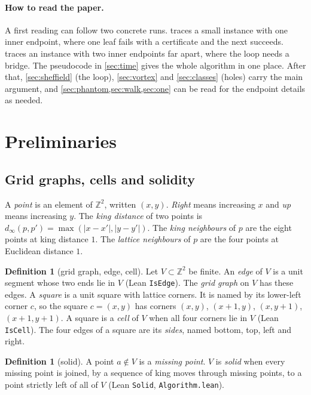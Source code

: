 \documentclass[11pt]{article}
\theoremstyle{plain}
\theoremstyle{definition}
\newtheorem{definition}[theorem]{Definition}
\theoremstyle{remark}
\newcommand{\Z}{\mathbb{Z}}
\newcommand{\lean}[1]{\texttt{#1}}
\newcommand{\dist}{d_\infty}
\begin{document}
\paragraph{How to read the paper.}
A first reading can follow two concrete runs.
 traces a small instance with one inner endpoint, where one leaf fails with a
certificate and the next succeeds.
 traces an instance with two inner endpoints far apart, where the loop needs a
bridge.
The pseudocode in \cref{sec:time} gives the whole algorithm in one place.
After that, \cref{sec:sheffield} (the loop), \cref{sec:vortex} and \cref{sec:classes} (holes) carry
the main argument, and \cref{sec:phantom,sec:walk,sec:one} can be read for the endpoint details as
needed.

\section{Preliminaries}
\label{sec:prelim}

\subsection{Grid graphs, cells and solidity}

A \emph{point} is an element of $\Z^2$, written $(x,y)$.
\emph{Right} means increasing $x$ and \emph{up} means increasing $y$.
The \emph{king distance} of two points is $\dist(p,p')=\max(|x-x'|,|y-y'|)$.
The \emph{king neighbours} of $p$ are the eight points at king distance $1$.
The \emph{lattice neighbours} of $p$ are the four points at Euclidean distance $1$.

\begin{definition}[grid graph, edge, cell]
\label{def:grid}
Let $V\subset\Z^2$ be finite.
An \emph{edge} of $V$ is a unit segment whose two ends lie in $V$ (Lean \lean{IsEdge}).
The \emph{grid graph} on $V$ has these edges.
A \emph{square} is a unit square with lattice corners.
It is named by its lower-left corner $c$, so the square $c=(x,y)$ has corners $(x,y)$,
$(x+1,y)$, $(x,y+1)$, $(x+1,y+1)$.
A square is a \emph{cell} of $V$ when all four corners lie in $V$ (Lean \lean{IsCell}).
The four edges of a square are its \emph{sides}, named bottom, top, left and right.
\end{definition}

\begin{definition}[solid]
\label{def:solid}
A point $a\notin V$ is a \emph{missing point}.
$V$ is \emph{solid} when every missing point is joined, by a sequence of king moves through
missing points, to a point strictly left of all of $V$ (Lean \lean{Solid}, \lean{Algorithm.lean}).
\end{definition}
\end{document}
